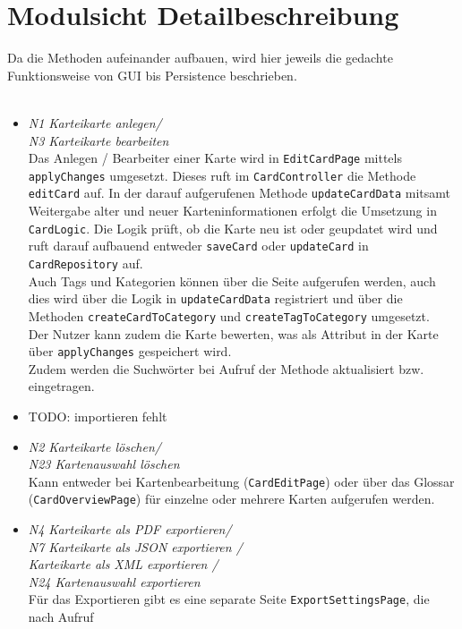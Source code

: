 \documentclass[fontsize=12pt,paper=A4,twoside]{scrartcl}
\begin{document}
    \section{Modulsicht Detailbeschreibung}
    Da die Methoden aufeinander aufbauen, wird hier jeweils die gedachte Funktionsweise von GUI bis Persistence beschrieben.\\\\
    \begin{itemize}
    \item \textit{N1 Karteikarte anlegen/\\ N3 Karteikarte bearbeiten}\\
    Das Anlegen / Bearbeiter einer Karte wird in \texttt{EditCardPage} mittels \texttt{applyChanges} umgesetzt.
    Dieses ruft im \texttt{CardController} die Methode \texttt{editCard} auf. In der darauf aufgerufenen Methode
    \texttt{updateCardData} mitsamt Weitergabe alter und neuer Karteninformationen erfolgt die Umsetzung in \texttt{CardLogic}.
    Die Logik prüft, ob die Karte neu ist oder geupdatet wird und ruft darauf aufbauend entweder \texttt{saveCard} oder \texttt{updateCard}
    in \texttt{CardRepository} auf.\\
    Auch Tags und Kategorien können über die Seite aufgerufen werden, auch dies wird über die Logik in \texttt{updateCardData} registriert und über die Methoden
    \texttt{createCardToCategory} und \texttt{createTagToCategory} umgesetzt.\\
    Der Nutzer kann zudem die Karte bewerten, was als Attribut in der Karte über \texttt{applyChanges} gespeichert wird.\\
    Zudem werden die Suchwörter bei Aufruf der Methode aktualisiert bzw. eingetragen.
    \item TODO: importieren fehlt\\
    \item \textit{N2 Karteikarte löschen/\\ N23 Kartenauswahl löschen}\\
    Kann entweder bei Kartenbearbeitung (\texttt{CardEditPage}) oder über das Glossar (\texttt{CardOverviewPage})
    für einzelne oder mehrere Karten aufgerufen werden.
    \item \textit{N4 Karteikarte als PDF exportieren/\\ N7 Karteikarte als JSON exportieren /\\Karteikarte als XML exportieren /\\ N24 Kartenauswahl exportieren}\\ Für das Exportieren gibt es eine separate Seite \texttt{ExportSettingsPage}, die nach Aufruf

\end{itemize}
\end{document}
